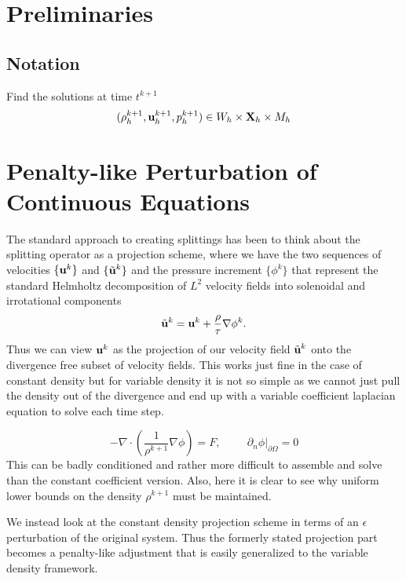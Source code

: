 \documentclass[letterpaper]{erdc}
\begin{document}
%
%
%
\section{Preliminaries}

%
%
\subsection{Notation}
Find the solutions at time $t^{k+1}$
\begin{equation}(\rho^{k+1}_h, \textbf{u}^{k+1}_{h}, p^{k+1}_h) \in W_h\times\textbf{X}_h\times M_h  \end{equation}

%
%
%
\section{Penalty-like Perturbation of Continuous Equations}
The standard approach to creating splittings has been to think about the splitting operator as a projection scheme, where we have the two sequences of velocities $\{\textbf{u}^{k}\}$ and $\{\tilde{\textbf{u}}^{k}\}$ and the pressure increment $\{\phi^{k}\}$ that represent the standard Helmholtz decomposition of $L^{2}$ velocity fields into solenoidal and irrotational components
\begin{equation}
  \tilde{\textbf{u}}^{k} = \textbf{u}^{k} + \frac{\rho}{\tau}\nabla \phi^{k}.
\end{equation}
Thus we can view $\textbf{u}^{k}$ as the projection of our velocity field $\tilde{\textbf{u}}^{k}$ onto the divergence free subset of velocity fields.  This works just fine in the case of constant density but for variable density it is not so simple as we cannot just pull the density out of the divergence and end up with a variable coefficient laplacian equation to solve each time step.

\begin{equation}
  -\nabla\cdot\left(\frac{1}{\rho^{k+1}} \nabla\phi \right) = F,  \hspace{1cm} \left.\partial_n \phi\right|_{\partial\Omega} = 0
\end{equation}  
This can be badly conditioned and rather more difficult to assemble and solve than the constant coefficient version.  Also, here it is clear to see why uniform lower bounds on the density $\rho^{k+1}$ must be maintained.

We instead look at the constant density projection scheme in terms of an $\epsilon$ perturbation of the original system. Thus the formerly stated projection part becomes a penalty-like adjustment that is easily generalized to the variable density framework.
\end{document}
